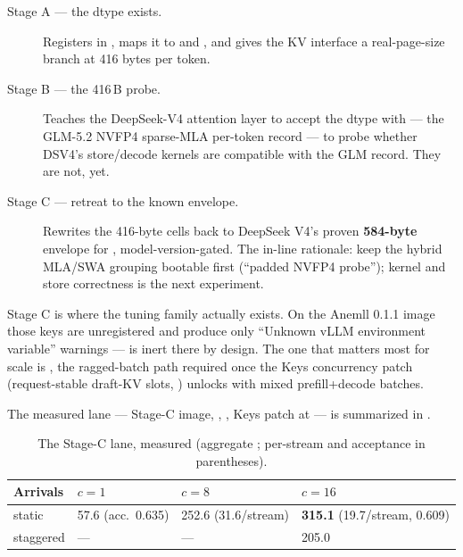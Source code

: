 \begin{description}
\item[Stage A --- the dtype exists.] Registers  in
, maps it to  and
, and gives the KV interface a real-page-size branch
at 416 bytes per token.
\item[Stage B --- the 416\,B probe.] Teaches the DeepSeek-V4 attention layer
to accept the dtype with  --- the GLM-5.2 NVFP4
sparse-MLA per-token record --- to probe whether DSV4's store/decode kernels
are compatible with the GLM record. They are not, yet.
\item[Stage C --- retreat to the known envelope.] \sloppy Rewrites the
416-byte cells back to DeepSeek V4's proven \textbf{584-byte} envelope for
, model-version-gated. The in-line rationale: keep the
hybrid MLA/SWA grouping bootable first (``padded NVFP4 probe''); kernel and
store correctness is the next experiment.
\end{description}

Stage C is where the  tuning family actually exists.
On the Anemll 0.1.1 image those keys are unregistered and produce only
``Unknown vLLM environment variable'' warnings ---
 is inert there by design. The
one that matters most for scale is
, the ragged-batch path
required once the Keys concurrency patch (request-stable draft-KV slots,
) unlocks  with mixed
prefill+decode batches.

The measured lane --- Stage-C image, ,
, Keys patch at  --- is summarized in
.

\begin{table}[htbp]
\centering\small
\caption{The Stage-C lane, measured (aggregate \tokspersec{}; per-stream and
acceptance in parentheses).}
\label{tab:stagec-lane}
\begin{tabular}{@{}llll@{}}
\toprule
Arrivals & $c{=}1$ & $c{=}8$ & $c{=}16$ \\
\midrule
static & 57.6 (acc.\ 0.635) & 252.6 (31.6/stream) &
\textbf{315.1} (19.7/stream, 0.609) \\
staggered & --- & --- & 205.0 \\
\bottomrule
\end{tabular}
\end{table}


